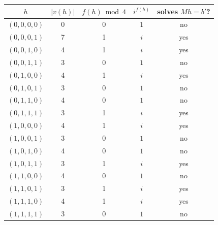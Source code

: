 \begin{tabular}{ccccc}\toprule
$h$ & $|v(h)|$ & $f(h)\bmod4$ & $i^{f(h)}$ & solves $Mh=b'$? \\\midrule
$(0,0,0,0)$ & 0 & 0 & $1$ & no \\
$(0,0,0,1)$ & 7 & 1 & $i$ & yes \\
$(0,0,1,0)$ & 4 & 1 & $i$ & yes \\
$(0,0,1,1)$ & 3 & 0 & $1$ & no \\
$(0,1,0,0)$ & 4 & 1 & $i$ & yes \\
$(0,1,0,1)$ & 3 & 0 & $1$ & no \\
$(0,1,1,0)$ & 4 & 0 & $1$ & no \\
$(0,1,1,1)$ & 3 & 1 & $i$ & yes \\
$(1,0,0,0)$ & 4 & 1 & $i$ & yes \\
$(1,0,0,1)$ & 3 & 0 & $1$ & no \\
$(1,0,1,0)$ & 4 & 0 & $1$ & no \\
$(1,0,1,1)$ & 3 & 1 & $i$ & yes \\
$(1,1,0,0)$ & 4 & 0 & $1$ & no \\
$(1,1,0,1)$ & 3 & 1 & $i$ & yes \\
$(1,1,1,0)$ & 4 & 1 & $i$ & yes \\
$(1,1,1,1)$ & 3 & 0 & $1$ & no \\
\bottomrule\end{tabular}
